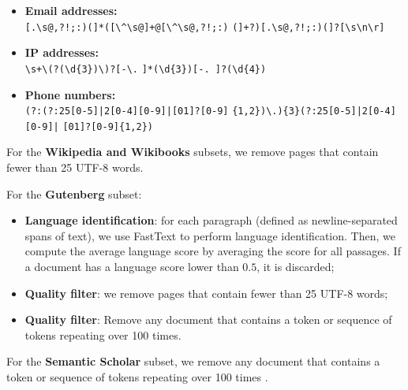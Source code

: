 \begin{itemize}
    \item \textbf{Email addresses:}\\
    \texttt{[.\textbackslash{}s@,?!;:)(]*([\textbackslash{}\textasciicircum{}\textbackslash{}s@]+@[\textbackslash{}\textasciicircum{}\textbackslash{}s@,?!;:)}
    \newline\texttt{(]+?)[.\textbackslash{}s@,?!;:)}\texttt{(]?[\textbackslash{}s\textbackslash{}n\textbackslash{}r]
}
    \item \textbf{IP addresses:} \\
    \texttt{\textbackslash{}s+\textbackslash{}(?(\textbackslash{}d\{3\})\textbackslash{})?[-\textbackslash{}.}
    \newline\texttt{]*(\textbackslash{}d\{3\})[-. ]?(\textbackslash{}d\{4\})}
    \item \textbf{Phone numbers:} \\
    \texttt{(?:(?:25[0-5]|2[0-4][0-9]|[01]?[0-9]}
    \newline\texttt{\{1,2\})\textbackslash.)\{3\}}\texttt{(?:25[0-5]|2[0-4][0-9]|}
    \newline\texttt{[01]?[0-9]\{1,2\})}
\end{itemize}



For the \textbf{Wikipedia and Wikibooks} subsets, we remove pages that contain fewer than 25 UTF-8 words. 

For the \textbf{Gutenberg} subset:
\begin{itemize}[leftmargin=1em]
    \item \textbf{Language identification}: for each paragraph (defined as newline-separated spans of text), we use FastText to perform language identification. 
    Then, we compute the average language score by averaging the score for all passages. 
    If a document has a language score lower than $0.5$, it is discarded;
    \item \textbf{Quality filter}: we remove pages that contain fewer than 25 UTF-8 words;
    \item \textbf{Quality filter}: Remove any document that contains a token or sequence of tokens repeating over 100 times.
\end{itemize}

For the \textbf{Semantic Scholar} subset, we remove any document that contains a token or sequence of tokens repeating over 100 times .

